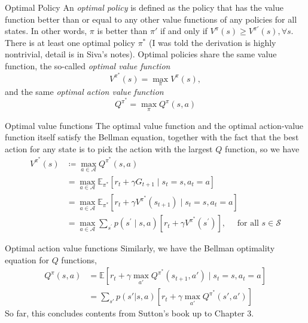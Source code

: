 \documentclass[handout]{beamer}
\begin{document}
\begin{frame}{Optimal Policy}
    An \textit{optimal policy} is defined as the policy that has the value function better than or equal to any other value functions of any policies for all states. In other words, $\pi$ is better than $\pi'$ if and only if $V^{\pi}(s) \geq V^{\pi'}(s), \forall s$. There is at least one optimal policy $\pi^*$ (I was told the derivation is highly nontrivial, detail is in Siva's notes). Optimal policies share the same value function, the so-called \textit{optimal value function}
    $$
    V^{\pi^*}(s) = \max_{\pi} V^{\pi}(s),$$ and the same \textit{optimal action value function} 
    $$
    Q^{\pi^*} = \max_{\pi} Q^{\pi}(s,a)$$
\end{frame}

\begin{frame}{Optimal value functions}
    The optimal value function and the optimal action-value function itself satisfy the Bellman equation, together with the fact that the best action for any state is to pick the action with the largest $Q$ function, so we have
    \begin{equation}
    \begin{aligned}
    V^{\pi^*}(s) & \coloneqq \max_{a\in\mathcal{A}} Q^{\pi^*}(s,a) \\
    &=\max_{a\in\mathcal{A}} \mathbb{E}_{\pi^*}\left[r_{t}+\gamma G_{t+1} \mid s_{t}=s, a_{t}=a\right] \\
    &=\max_{a\in\mathcal{A}} \mathbb{E}_{\pi^*}\left[r_{t}+\gamma V^{\pi^*}(s_{t+1}) \mid s_{t}=s, a_{t}=a\right] \\
    &=\max_{a\in\mathcal{A}} \sum_{s^{\prime}} p\left(s^{\prime}\mid s, a\right)\left[r_t +\gamma V^{\pi^*}\left(s^{\prime}\right)\right], \quad \text { for all } s \in \mathcal{S}
    \end{aligned}
    \end{equation}
\end{frame}

\begin{frame}{Optimal action value functions}
    Similarly, we have the Bellman optimality equation for $Q$ functions,
    \begin{equation}
    \begin{aligned}
    Q^{\pi}(s,a) &= \mathbb{E} \left[r_t +\gamma \max_{a'} Q^{\pi^*}(s_{t+1},a') \mid s_t = s, a_t = a \right] \\
    &= \sum_{s'} p(s'|s,a)\left[ r_t + \gamma \max_{a'} Q^{\pi^*}(s',a') \right]
    \end{aligned}
    \end{equation}
    So far, this concludes contents from Sutton's book up to Chapter 3.
\end{frame}
\end{document}
